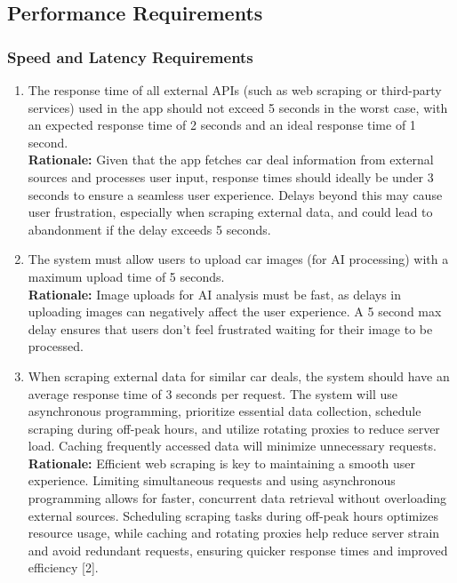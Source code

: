 \documentclass[]{article}
\begin{document}

\subsection{Performance Requirements}
\label{sub:performance_requirements}

\subsubsection{Speed and Latency Requirements}
\label{ssub:speed_and_latency_requirements}
\begin{enumerate}[{PR-SL}1.]
    \item The response time of all external APIs (such as web scraping or third-party services) used in the app should not exceed 5 seconds in the worst case, with an expected response time of 2 seconds and an ideal response time of 1 second.  \\
    \textbf{Rationale:} Given that the app fetches car deal information from external sources and processes user input, response times should ideally be under 3 seconds to ensure a seamless user experience. Delays beyond this may cause user frustration, especially when scraping external data, and could lead to abandonment if the delay exceeds 5 seconds.

    \item The system must allow users to upload car images (for AI processing) with a maximum upload time of 5 seconds.  \\
    \textbf{Rationale:} Image uploads for AI analysis must be fast, as delays in uploading images can negatively affect the user experience. A 5 second max delay ensures that users don't feel frustrated waiting for their image to be processed.

    \item When scraping external data for similar car deals, the system should have an average response time of 3 seconds per request. The system will use asynchronous programming, prioritize essential data collection, schedule scraping during off-peak hours, and utilize rotating proxies to reduce server load. Caching frequently accessed data will minimize unnecessary requests.  \\
    \textbf{Rationale:} Efficient web scraping is key to maintaining a smooth user experience. Limiting simultaneous requests and using asynchronous programming allows for faster, concurrent data retrieval without overloading external sources. Scheduling scraping tasks during off-peak hours optimizes resource usage, while caching and rotating proxies help reduce server strain and avoid redundant requests, ensuring quicker response times and improved efficiency [2].
\end{enumerate}
\end{document}
